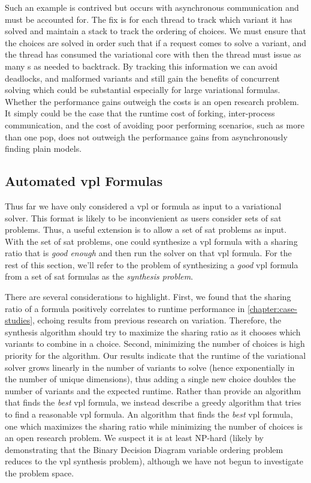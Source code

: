 Such an example is contrived but occurs with asynchronous communication and must
be accounted for. The fix is for each thread to track which variant it has
solved and maintain a stack to track the ordering of choices. We must ensure
that the choices are solved in order such that if a request comes to solve a
 variant, and the thread has consumed the variational core with
 then the thread must issue as many s as needed to
backtrack. By tracking this information we can avoid deadlocks, and malformed
variants and still gain the benefits of concurrent solving which could be
substantial especially for large variational formulas. Whether the performance
gains outweigh the costs is an open research problem. It simply could be the
case that the runtime cost of forking, inter-process communication, and the cost
of avoiding poor performing scenarios, such as more than one pop, does not
outweigh the performance gains from asynchronously finding plain models.

\subsection{Automated \ac{vpl} Formulas}
Thus far we have only considered a \ac{vpl} or \evpl{} formula as input to a
variational solver. This format is likely to be inconvienient as users consider
sets of \ac{sat} problems. Thus, a useful extension is to allow a set of
\ac{sat} problems as input. With the set of \ac{sat} problems, one could
synthesize a \ac{vpl} formula with a sharing ratio that is \emph{good enough}
and then run the solver on that \ac{vpl} formula. For the rest of this section,
we'll refer to the problem of synthesizing a \emph{good} \ac{vpl} formula from a
set of \ac{sat} formulas as the \emph{synthesis problem}.

There are several considerations to highlight. First, we found that the sharing
ratio of a formula positively correlates to runtime performance in
\autoref{chapter:case-studies}, echoing results from previous research on
variation. Therefore, the synthesis algorithm should try to maximize the sharing
ratio as it chooses which variants to combine in a choice. Second, minimizing
the number of choices is high priority for the algorithm. Our results indicate
that the runtime of the variational solver grows linearly in the number of
variants to solve (hence exponentially in the number of unique dimensions), thus
adding a single new choice doubles the number of variants and the expected
runtime. Rather than provide an algorithm that finds the \emph{best} \ac{vpl}
formula, we instead describe a greedy algorithm that tries to find a reasonable
\ac{vpl} formula. An algorithm that finds the \emph{best} \ac{vpl} formula,
\eg{} one which maximizes the sharing ratio while minimizing the number of
choices is an open research problem. We suspect it is at least NP-hard (likely
by demonstrating that the Binary Decision Diagram variable ordering problem
reduces to the \ac{vpl} synthesis problem), although we have not begun to
investigate the problem space.

